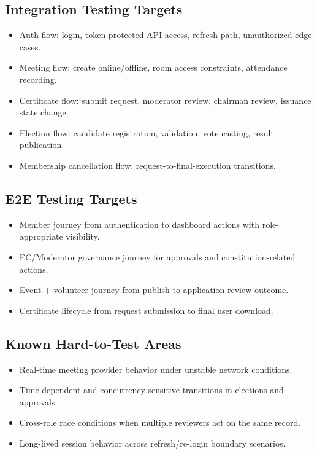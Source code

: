 \documentclass[12pt,a4paper]{article}
\begin{document}
\subsection{Integration Testing Targets}

\begin{itemize}[noitemsep]
  \item Auth flow: login, token-protected API access, refresh path, unauthorized edge cases.
  \item Meeting flow: create online/offline, room access constraints, attendance recording.
  \item Certificate flow: submit request, moderator review, chairman review, issuance state change.
  \item Election flow: candidate registration, validation, vote casting, result publication.
  \item Membership cancellation flow: request-to-final-execution transitions.
\end{itemize}

\subsection{E2E Testing Targets}

\begin{itemize}[noitemsep]
  \item Member journey from authentication to dashboard actions with role-appropriate visibility.
  \item EC/Moderator governance journey for approvals and constitution-related actions.
  \item Event + volunteer journey from publish to application review outcome.
  \item Certificate lifecycle from request submission to final user download.
\end{itemize}

\subsection{Known Hard-to-Test Areas}

\begin{itemize}[noitemsep]
  \item Real-time meeting provider behavior under unstable network conditions.
  \item Time-dependent and concurrency-sensitive transitions in elections and approvals.
  \item Cross-role race conditions when multiple reviewers act on the same record.
  \item Long-lived session behavior across refresh/re-login boundary scenarios.
\end{itemize}
\end{document}
